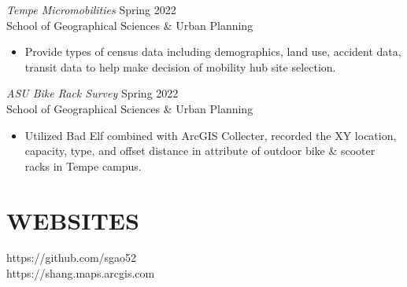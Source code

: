 \documentclass[margin,10pt]{res} %
\begin{document}
\begin{resume}
{\sl Tempe Micromobilities} \hfill Spring 2022 \\
School of Geographical Sciences \& Urban Planning
\begin{itemize}
    \item Provide types of census data including demographics, land use, accident data, transit data to help make decision of mobility hub site selection.
\end{itemize}

{\sl ASU Bike Rack Survey} \hfill Spring 2022 \\
School of Geographical Sciences \& Urban Planning
\begin{itemize}
    \item Utilized Bad Elf combined with ArcGIS Collecter, recorded the XY location, capacity, type, and offset distance in attribute of outdoor bike \& scooter racks in Tempe campus.
\end{itemize}


\section{WEBSITES} 
https://github.com/sgao52 \\
https://shang.maps.arcgis.com \\

\end{resume}
\end{document}
